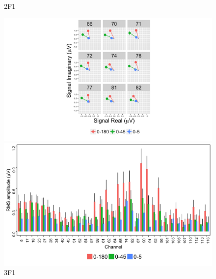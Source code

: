 \documentclass[landscape,final,paperwidth=72in,paperheight=42in,fontscale=0.285]{baposter}
\begin{document}
\begin{poster}
{\begin{demobox}[title=Direction-Speed Interaction]
\end{demobox}
\hspace{0.5em}
\begin{demobox}[title=Channel Effects]

\begin{figure}[H]
  \centering
    \caption{2F1}\label{plot-vector-avg-1.png}
    \includegraphics[scale=0.25]{../../figs/2F1/plot-vector-avg-1.png}
  \centering
    \caption{3F1}\label{3F1-analyze-and-plot-main-effects-1.png}
    \includegraphics[scale=0.25]{../../figs/3F1/plot-channel-effects-1.png}
\end{figure}

\end{demobox}
}
        {


}
\end{poster}
\end{document}
